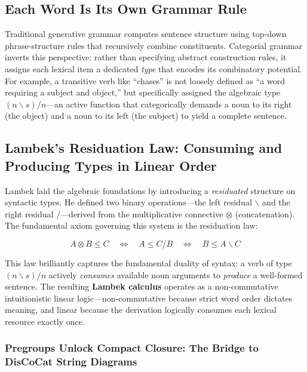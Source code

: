 \documentclass[
]{article}
\begin{document}
\subsection{Each Word Is Its Own Grammar
Rule}\label{each-word-is-its-own-grammar-rule}

Traditional generative grammar computes sentence structure using
top-down phrase-structure rules that recursively combine constituents.
Categorial grammar inverts this perspective: rather than specifying
abstract construction rules, it assigns each lexical item a dedicated
\emph{type} that encodes its combinatory potential. For example, a
transitive verb like ``chases'' is not loosely defined as ``a word
requiring a subject and object,'' but specifically assigned the
algebraic type \((n \backslash s) / n\)---an active function that
categorically demands a noun to its right (the object) and a noun to its
left (the subject) to yield a complete sentence.

\subsection{Lambek's Residuation Law: Consuming and Producing Types in
Linear
Order}\label{lambeks-residuation-law-consuming-and-producing-types-in-linear-order}

Lambek \citeyearpar{lambek1958mathematics} laid the algebraic
foundations by introducing a \emph{residuated} structure on syntactic
types. He defined two binary operations---the left residual
\(\backslash\) and the right residual \(/\)---derived from the
multiplicative connective \(\otimes\) (concatenation). The fundamental
axiom governing this system is the residuation law:

\begin{equation}
A \otimes B \leq C \quad \iff \quad A \leq C / B \quad \iff \quad B \leq A \backslash C
\label{eq:eq-3-1}
\end{equation}

This law brilliantly captures the fundamental duality of syntax: a verb
of type \((n \backslash s) / n\) actively \emph{consumes} available noun
arguments to \emph{produce} a well-formed sentence. The resulting
\textbf{Lambek calculus} operates as a non-commutative intuitionistic
linear logic---non-commutative because strict word order dictates
meaning, and linear because the derivation logically consumes each
lexical resource exactly once.

\subsubsection{Pregroups Unlock Compact Closure: The Bridge to DisCoCat
String
Diagrams}\label{pregroups-unlock-compact-closure-the-bridge-to-discocat-string-diagrams}
\end{document}
